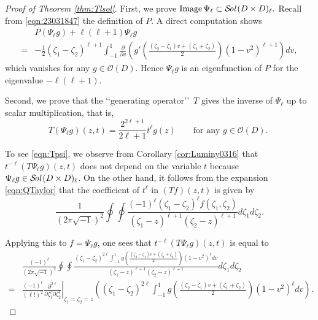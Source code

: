 \documentclass[12pt,leqno]{amsart}
\theoremstyle{plain}
\theoremstyle{definition}
\newcommand\Sol{{\mathcal {S}}\!{\text{\it{ol}}}\,}
\begin{document}
\begin{proof}
[Proof of Theorem \ref{thm:Tlsol}]
First, 
 we prove
$
  \operatorname{Image}\Psi_{\ell} \subset \Sol(D \times D)_{\ell}.  
$
Recall from \eqref{eqn:23031847} the definition of $P.$  
A direct computation shows 
\begin{align*}
&P(\Psi_{\ell}g)
+ \ell (\ell+1) \Psi_{\ell}g 
\\
=&
 -\frac 1 2 (\zeta_1 - \zeta_2)^{\ell+1} \int_{-1}^1 \frac{\partial}{\partial v}
 (g'(\frac{(\zeta_2- \zeta_1)v+(\zeta_1 + \zeta_2)}2)(1-v^2)^{\ell+1}) d v, 
\end{align*}
which vanishes for any $g \in {\mathcal{O}}(D)$.  
Hence $\Psi_{\ell}g$ is an eigenfunction of $P$
 for the eigenvalue $-\ell(\ell+1)$.  



Second, 
 we prove
 that the \lq\lq{generating operator}\rq\rq\ $T$ gives
 the inverse of $\Psi_{\ell}$
 up to scalar multiplication, 
 that is, 
\begin{equation}
\label{eqn:Tpsi}
   T(\Psi_{\ell}g)(z,t)=\frac{2^{2 \ell+1}}{2 \ell +1} t^{\ell}g(z)
\qquad\text{for any $g \in {\mathcal{O}}(D)$.  }
\end{equation}



To see \eqref{eqn:Tpsi}, 
 we observe from Corollary \ref{cor:Luminy0316}
 that $t^{-\ell}(T \Psi_{\ell}g)(z,t)$ does not depend 
 on the variable $t$
 because $\Psi_{\ell} g \in \Sol(D \times D)_{\ell}$.  
On the other hand, 
 it follows from the expansion \eqref{eqn:QTaylor}
 that the coefficient of $t^{\ell}$ in $(T f)(z,t)$
 is given by 
\[
  \frac{1}{(2 \pi \sqrt{-1})^2}
  \oint \oint \frac{(-1)^{\ell}(\zeta_1-\zeta_2)^{\ell} f(\zeta_1, \zeta_2)}{
(\zeta_1-z)^{\ell+1}(\zeta_2-z)^{\ell+1}} d \zeta_1 d \zeta_2.  
\]



Applying this to $f=\Psi_{\ell}g$, 
 one sees that $t^{-\ell}(T \Psi_{\ell} g)(z,t)$ is equal to 
\begin{align*}
  &\frac{(-1)^{\ell}}{(2 \pi \sqrt{-1})^2}
  \oint \oint 
  \frac
  {(\zeta_1-\zeta_2)^{2\ell}\int_{-1}^1 g(\frac{(\zeta_2- \zeta_1)v+(\zeta_1 + \zeta_2)}2)(1-v^2)^{\ell} d v}
  {(\zeta_1-z)^{\ell+1}(\zeta_2-z)^{\ell+1}} d \zeta_1 d \zeta_2
\\
=& \frac{(-1)^{\ell}}{(\ell !)^2}
   \left. \frac{\partial^{2\ell}}
               {\partial \zeta_1^{\ell} \partial \zeta_2^{\ell}}\right|_{\zeta_1=\zeta_2=z}
   ((\zeta_1-\zeta_2)^{2\ell}
    \int_{-1}^1 g(\frac{(\zeta_2- \zeta_1)v+(\zeta_1 + \zeta_2)}2)(1-v^2)^{\ell} d v).  
\end{align*}




\end{proof}
\end{document}
